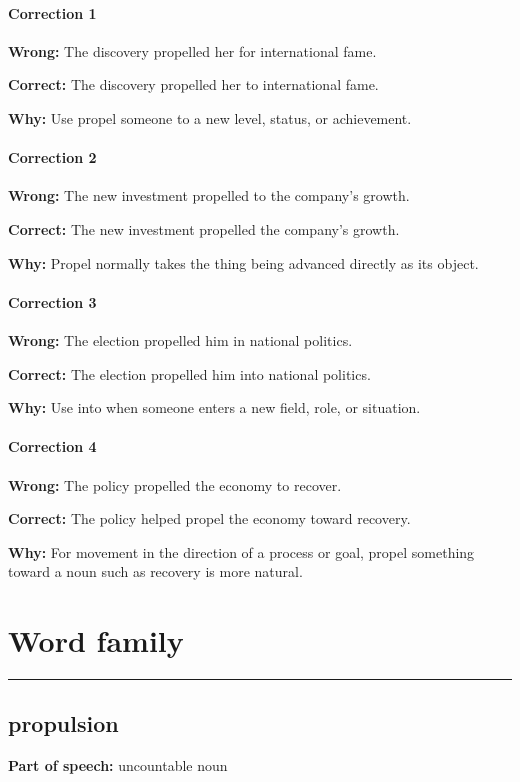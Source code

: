 \documentclass[11pt]{article}
\newcommand{\sectionrule}{\par\vspace{-0.5em}\noindent\textcolor{Accent}{\rule{\linewidth}{0.6pt}}\par}
\begin{document}
\paragraph{Correction 1}
\textbf{Wrong:} The discovery propelled her for international fame.

\textbf{Correct:} The discovery propelled her to international fame.

\textbf{Why:} Use propel someone to a new level, status, or achievement.

\paragraph{Correction 2}
\textbf{Wrong:} The new investment propelled to the company's growth.

\textbf{Correct:} The new investment propelled the company's growth.

\textbf{Why:} Propel normally takes the thing being advanced directly as its object.

\paragraph{Correction 3}
\textbf{Wrong:} The election propelled him in national politics.

\textbf{Correct:} The election propelled him into national politics.

\textbf{Why:} Use into when someone enters a new field, role, or situation.

\paragraph{Correction 4}
\textbf{Wrong:} The policy propelled the economy to recover.

\textbf{Correct:} The policy helped propel the economy toward recovery.

\textbf{Why:} For movement in the direction of a process or goal, propel something toward a noun such as recovery is more natural.

\section{Word family}
\sectionrule
\subsection{propulsion}
\textbf{Part of speech:} uncountable noun
\end{document}
